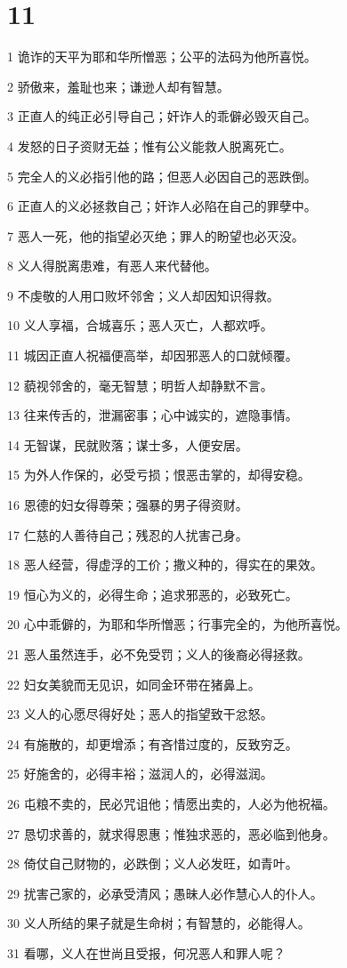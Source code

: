 \chapter{11}

\par 1 诡诈的天平为耶和华所憎恶；公平的法码为他所喜悦。
\par 2 骄傲来，羞耻也来；谦逊人却有智慧。
\par 3 正直人的纯正必引导自己；奸诈人的乖僻必毁灭自己。
\par 4 发怒的日子资财无益；惟有公义能救人脱离死亡。
\par 5 完全人的义必指引他的路；但恶人必因自己的恶跌倒。
\par 6 正直人的义必拯救自己；奸诈人必陷在自己的罪孽中。
\par 7 恶人一死，他的指望必灭绝；罪人的盼望也必灭没。
\par 8 义人得脱离患难，有恶人来代替他。
\par 9 不虔敬的人用口败坏邻舍；义人却因知识得救。
\par 10 义人享福，合城喜乐；恶人灭亡，人都欢呼。
\par 11 城因正直人祝福便高举，却因邪恶人的口就倾覆。
\par 12 藐视邻舍的，毫无智慧；明哲人却静默不言。
\par 13 往来传舌的，泄漏密事；心中诚实的，遮隐事情。
\par 14 无智谋，民就败落；谋士多，人便安居。
\par 15 为外人作保的，必受亏损；恨恶击掌的，却得安稳。
\par 16 恩德的妇女得尊荣；强暴的男子得资财。
\par 17 仁慈的人善待自己；残忍的人扰害己身。
\par 18 恶人经营，得虚浮的工价；撒义种的，得实在的果效。
\par 19 恒心为义的，必得生命；追求邪恶的，必致死亡。
\par 20 心中乖僻的，为耶和华所憎恶；行事完全的，为他所喜悦。
\par 21 恶人虽然连手，必不免受罚；义人的後裔必得拯救。
\par 22 妇女美貌而无见识，如同金环带在猪鼻上。
\par 23 义人的心愿尽得好处；恶人的指望致干忿怒。
\par 24 有施散的，却更增添；有吝惜过度的，反致穷乏。
\par 25 好施舍的，必得丰裕；滋润人的，必得滋润。
\par 26 屯粮不卖的，民必咒诅他；情愿出卖的，人必为他祝福。
\par 27 恳切求善的，就求得恩惠；惟独求恶的，恶必临到他身。
\par 28 倚仗自己财物的，必跌倒；义人必发旺，如青叶。
\par 29 扰害己家的，必承受清风；愚昧人必作慧心人的仆人。
\par 30 义人所结的果子就是生命树；有智慧的，必能得人。
\par 31 看哪，义人在世尚且受报，何况恶人和罪人呢？

